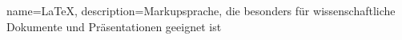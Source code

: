 \usepackage{glossaries}
\makeglossaries

{
    name=\LaTeX,
    description={Markupsprache, die besonders für
      wissenschaftliche Dokumente und
      Präsentationen geeignet ist}
}
